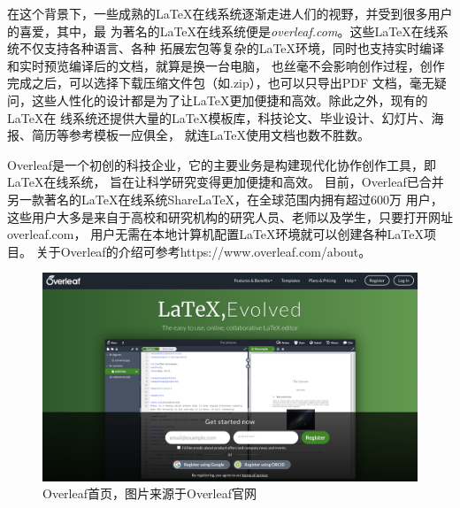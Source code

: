 在这个背景下，一些成熟的LaTeX在线系统逐渐走进人们的视野，并受到很多用户的喜爱，其中，最
为著名的LaTeX在线系统便是\emph{overleaf.com}。这些LaTeX在线系统不仅支持各种语言、各种
拓展宏包等复杂的LaTeX环境，同时也支持实时编译和实时预览编译后的文档，就算是换一台电脑，
也丝毫不会影响创作过程，创作完成之后，可以选择下载压缩文件包（如.zip），也可以只导出PDF
文档，毫无疑问，这些人性化的设计都是为了让LaTeX更加便捷和高效。除此之外，现有的LaTeX在
线系统还提供大量的LaTeX模板库，科技论文、毕业设计、幻灯片、海报、简历等参考模板一应俱全，
就连LaTeX使用文档也数不胜数。

\begin{tcolorbox}[colback=red!5!white, colframe=red!50!black, title=在线系统 overleaf]
      Overleaf是一个初创的科技企业，它的主要业务是构建现代化协作创作工具，即LaTeX在线系统，
      旨在让科学研究变得更加便捷和高效。
      目前，Overleaf已合并另一款著名的LaTeX在线系统ShareLaTeX，在全球范围内拥有超过600万
      用户，这些用户大多是来自于高校和研究机构的研究人员、老师以及学生，只要打开网址overleaf.com，
      用户无需在本地计算机配置LaTeX环境就可以创建各种LaTeX项目。
      \tcblower
      关于Overleaf的介绍可参考https://www.overleaf.com/about。
\end{tcolorbox}

\begin{figure}
      \centering
      \includegraphics[width=\textwidth]{images/overleaf_webpage.png}
      \caption{Overleaf首页，图片来源于Overleaf官网}
\end{figure}

